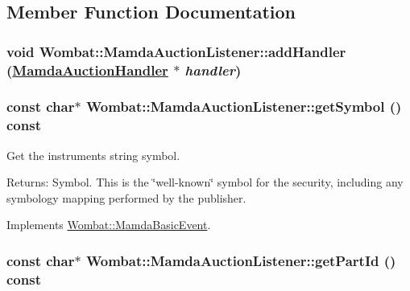 \subsection{Member Function Documentation}
\hypertarget{classWombat_1_1MamdaAuctionListener_5f36422751a3c573fa70fd6e025dfc35}{
\subsubsection[addHandler]{\setlength{\rightskip}{0pt plus 5cm}void Wombat::Mamda\-Auction\-Listener::add\-Handler (\hyperlink{classWombat_1_1MamdaAuctionHandler}{Mamda\-Auction\-Handler} $\ast$ {\em handler})}}
\label{classWombat_1_1MamdaAuctionListener_5f36422751a3c573fa70fd6e025dfc35}


\hypertarget{classWombat_1_1MamdaAuctionListener_3da43832419d2b77a848b7261b3c3d34}{
\subsubsection[getSymbol]{\setlength{\rightskip}{0pt plus 5cm}const char$\ast$ Wombat::Mamda\-Auction\-Listener::get\-Symbol () const}}
\label{classWombat_1_1MamdaAuctionListener_3da43832419d2b77a848b7261b3c3d34}


Get the instruments string symbol. 

\begin{Desc}
\item[Returns:]Symbol. This is the \char`\"{}well-known\char`\"{} symbol for the security, including any symbology mapping performed by the publisher. \end{Desc}


Implements \hyperlink{classWombat_1_1MamdaBasicEvent_8783b136a1305d21c578ced8618c090b}{Wombat::Mamda\-Basic\-Event}.\hypertarget{classWombat_1_1MamdaAuctionListener_e009ff1afdcd5b44383b46177749feac}{
\subsubsection[getPartId]{\setlength{\rightskip}{0pt plus 5cm}const char$\ast$ Wombat::Mamda\-Auction\-Listener::get\-Part\-Id () const}}
\label{classWombat_1_1MamdaAuctionListener_e009ff1afdcd5b44383b46177749feac}


